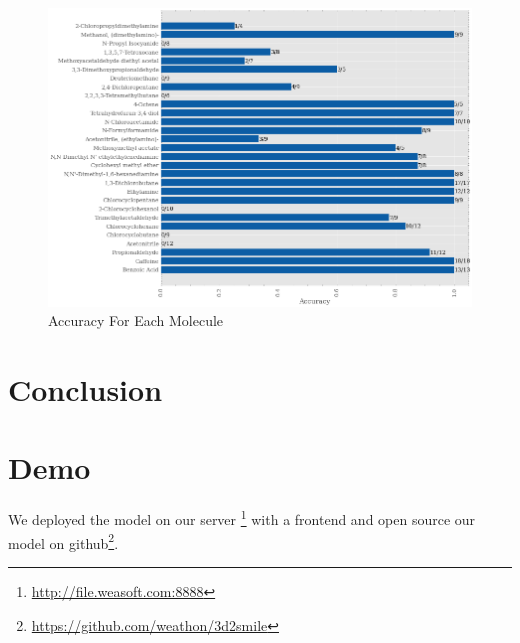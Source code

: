 \documentclass[12pt]{article}
\begin{document}
\begin{figure}
    \centering
    \includegraphics[width=1\linewidth]{image.png}
    \caption{Accuracy For Each Molecule}
    \label{fig:acc_each}
\end{figure}
\section{Conclusion}
\section{Demo}
We deployed the model on our server \footnote{\url{http://file.weasoft.com:8888}} with a frontend and open source our model on github\footnote{\url{https://github.com/weathon/3d2smile}}. 
\end{document}
